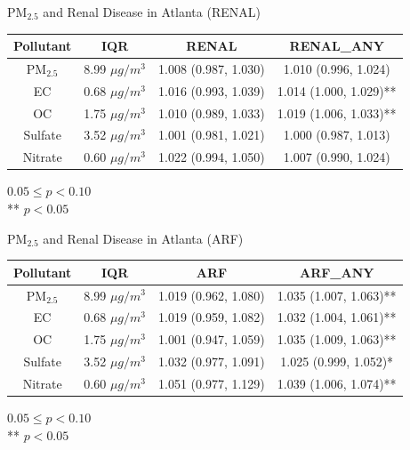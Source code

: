\documentclass[handout]{beamer} %
\begin{document}
\begin{frame}{PM$_{2.5}$ and Renal Disease in Atlanta (RENAL)}
    \begin{table}
        \small
        \centering
        \begin{tabular}{c|c|c|c}
            \hline
            Pollutant & IQR & RENAL & RENAL\_ANY \\
            \hline
            PM$_{2.5}$ & 8.99 $\mu g/m^3$ & 1.008 (0.987, 1.030) & 1.010 (0.996, 1.024) \\
            EC & 0.68 $\mu g/m^3$ & 1.016 (0.993, 1.039) & 1.014 (1.000, 1.029)** \\
            OC & 1.75 $\mu g/m^3$ & 1.010 (0.989, 1.033) & 1.019 (1.006, 1.033)** \\
            Sulfate & 3.52 $\mu g/m^3$ & 1.001 (0.981, 1.021) & 1.000 (0.987, 1.013) \\
            Nitrate & 0.60 $\mu g/m^3$ & 1.022 (0.994, 1.050) & 1.007 (0.990, 1.024) \\
            \hline
        \end{tabular}
    \end{table}
    {\footnotesize * $0.05 \leq p < 0.10$ \\ ** $p < 0.05$}
\end{frame}

\begin{frame}{PM$_{2.5}$ and Renal Disease in Atlanta (ARF)}
    \begin{table}
        \small
        \centering
        \begin{tabular}{c|c|c|c}
            \hline
            Pollutant & IQR & ARF & ARF\_ANY \\
            \hline
            PM$_{2.5}$ & 8.99 $\mu g/m^3$ & 1.019 (0.962, 1.080) & 1.035 (1.007, 1.063)** \\
            EC & 0.68 $\mu g/m^3$ & 1.019 (0.959, 1.082) & 1.032 (1.004, 1.061)** \\
            OC & 1.75 $\mu g/m^3$ & 1.001 (0.947, 1.059) & 1.035 (1.009, 1.063)** \\
            Sulfate & 3.52 $\mu g/m^3$ & 1.032 (0.977, 1.091) & 1.025 (0.999, 1.052)* \\
            Nitrate & 0.60 $\mu g/m^3$ & 1.051 (0.977, 1.129) & 1.039 (1.006, 1.074)** \\
            \hline
        \end{tabular}
    \end{table}
    {\footnotesize * $0.05 \leq p < 0.10$ \\ ** $p < 0.05$}
\end{frame}
\end{document}
